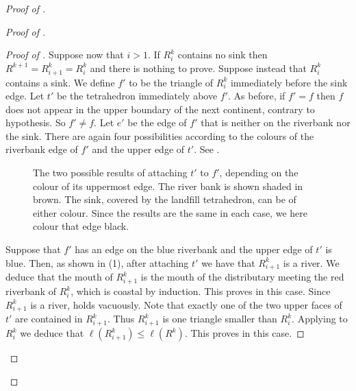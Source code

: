 \documentclass[12pt]{amsart}
\begin{document}
\begin{proof}[Proof of ]
\begin{proof}[Proof of ]
\begin{proof}[Proof of ]
Suppose now that $i > 1$.  If $R^k_i$ contains no sink then $R^{k+1} = R^k_{i+1} = R^k_i$ and there is nothing to prove.  Suppose instead that $R^k_i$ contains a sink.  We define $f'$ to be the triangle of $R^k_i$ immediately before the sink edge.  Let $t'$ be the tetrahedron immediately above $f'$.  As before, if $f' = f$ then $f$ does not appear in the upper boundary of the next continent, contrary to hypothesis.  So $f' \neq f$.   Let $e'$ be the edge of $f'$ that is neither on the riverbank nor the sink.  There are again four possibilities according to the colours of the riverbank edge of $f'$ and the upper edge of $t'$. See .

\begin{figure}[htb]
\centering
{}
\quad
{}
\caption{The two possible results of attaching $t'$ to $f'$, depending on the colour of its uppermost edge.  The river bank is shown shaded in brown.  The sink, covered by the landfill tetrahedron, can be of either colour.  Since the results are the same in each case, we here colour that edge black.}
\label{Fig:Moves}
\end{figure}

Suppose that $f'$ has an edge on the blue riverbank and the upper edge of $t'$ is blue.  Then, as shown in (1), after attaching $t'$ we have that $R^k_{i+1}$ is a river.  We deduce that the mouth of $R^k_{i+1}$ is the mouth of the distributary meeting the red riverbank of $R^k_i$, which is coastal by induction.  This proves  in this case.  Since $R^k_{i+1}$ is a river,  holds vacuously.  Note that exactly one of the two upper faces of $t'$ are contained in $R^k_{i+1}$.  Thus $R^k_{i+1}$ is one triangle smaller than $R^k_i$. Applying  to $R^k_i$ we deduce that $\ell(R^k_{i+1}) \leq \ell(R^k)$.  This proves  in this case. 


\end{proof}
\end{proof}
\end{proof}
\end{document}
